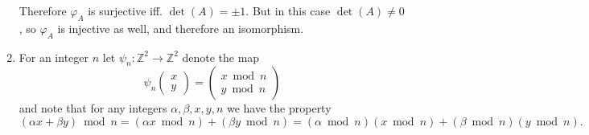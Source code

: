 \documentclass{article}
\begin{document}
\begin{Answer}
\begin{enumerate}
{\begin{itemize}
{%
      }
    \end{itemize}
    Therefore $\varphi_A$ is surjective iff. $\det(A) = \pm 1$. But in
    this case
    $\det(A) \neq 0$, so $\varphi_A$ is injective as well, and
    therefore an isomorphism.
  }
  \item
  {
    For an integer $n$ let
    $\psi_n : \mathbb{Z}^2 \to \mathbb{Z}^2$ denote the map
    $$
    \psi_n\left(\begin{array}{c}
            x \\ y
          \end{array}\right)
    =     \left(\begin{array}{c}
            x \bmod n \\ y \bmod n
          \end{array}\right)
    $$
    and note that for any integers $\alpha, \beta, x, y, n$ we have the property
    $$
    (\alpha x + \beta y) \bmod n =
      (\alpha x \bmod n) + (\beta y \bmod n) =
      (\alpha \bmod n)(x \bmod n) + (\beta \bmod n)(y \bmod n).
    $$

}
\end{enumerate}
\end{Answer}
\end{document}
